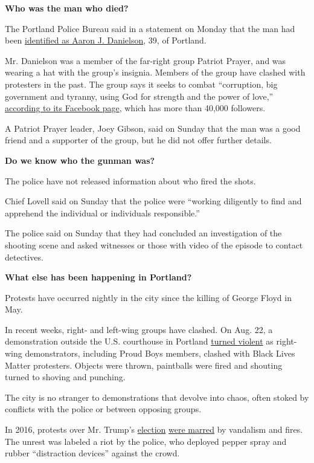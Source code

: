 \textbf{Who was the man who died?}

The Portland Police Bureau said in a statement on Monday that the man
had been
\href{https://www.nytimes3xbfgragh.onion/live/2020/08/31/us/trump-vs-biden/the-police-identified-the-man-who-was-shot-and-killed-in-portland-and-said-no-arrests-have-been-made}{identified
as Aaron J. Danielson}, 39, of Portland.

Mr. Danielson was a member of the far-right group Patriot Prayer, and
was wearing a hat with the group's insignia. Members of the group have
clashed with protesters in the past. The group says it seeks to combat
``corruption, big government and tyranny, using God for strength and the
power of love,''
\href{https://www.facebookcorewwwi.onion/PatriotPrayerUSA/about/?ref=page_internal}{according
to its Facebook page}, which has more than 40,000 followers.

A Patriot Prayer leader, Joey Gibson, said on Sunday that the man was a
good friend and a supporter of the group, but he did not offer further
details.

\textbf{Do we know who the gunman was?}

The police have not released information about who fired the shots.

Chief Lovell said on Sunday that the police were ``working diligently to
find and apprehend the individual or individuals responsible.''

The police said on Sunday that they had concluded an investigation of
the shooting scene and asked witnesses or those with video of the
episode to contact detectives.

\textbf{What else has been happening in Portland?}

Protests have occurred nightly in the city since the killing of George
Floyd in May.

In recent weeks, right- and left-wing groups have clashed. On Aug. 22, a
demonstration outside the U.S. courthouse in Portland
\href{https://www.nytimes3xbfgragh.onion/2020/08/22/us/portland-protests.html?action=click\&module=RelatedLinks\&pgtype=Article}{turned
violent} as right-wing demonstrators, including Proud Boys members,
clashed with Black Lives Matter protesters. Objects were thrown,
paintballs were fired and shouting turned to shoving and punching.

The city is no stranger to demonstrations that devolve into chaos, often
stoked by conflicts with the police or between opposing groups.

In 2016, protests over Mr. Trump's
\href{https://www.nytimes3xbfgragh.onion/live/2020/08/31/us/trump-vs-biden}{election}
\href{https://www.nytimes3xbfgragh.onion/2016/11/12/us/trump-protests-election-portland.html}{were
marred} by vandalism and fires. The unrest was labeled a riot by the
police, who deployed pepper spray and rubber ``distraction devices''
against the crowd.

